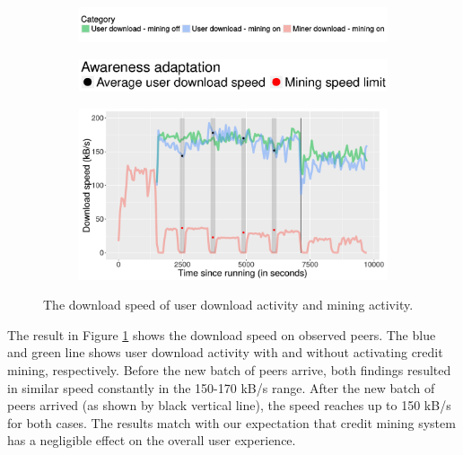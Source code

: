 \vspace{-0.4cm}
\begin{figure}[h!]
	
	\begin{subfigure}{\textwidth}
		\includegraphics[width=\textwidth]{pics/results/legends-prio.pdf}
	\end{subfigure}
	\begin{subfigure}{0.6\textwidth}
		\vspace{-0.65cm}
		\includegraphics[width=\textwidth]{pics/results/legends-prio2.eps}
	\end{subfigure}
	
	\begin{subfigure}{0.9\textwidth}
		\vspace{-0.2cm}
		\centering
		\includegraphics[width=\textwidth]{pics/results/pr_g2-act2_cpl2.pdf}
	\end{subfigure}
	\vspace{-0.2cm}
	\caption{The download speed of user download activity and mining activity.}
	\label{fig:cmprio}
\end{figure}

The result in Figure \ref{fig:cmprio} shows the download speed on observed peers. The blue and green line shows user download activity with and without activating credit mining, respectively. Before the new batch of peers arrive, both findings resulted in similar speed constantly in the 150-170 kB/s range. After the new batch of peers arrived (as shown by black vertical line), the speed reaches up to 150 kB/s for both cases. The results match with our expectation that credit mining system has a negligible effect on the overall user experience. 

